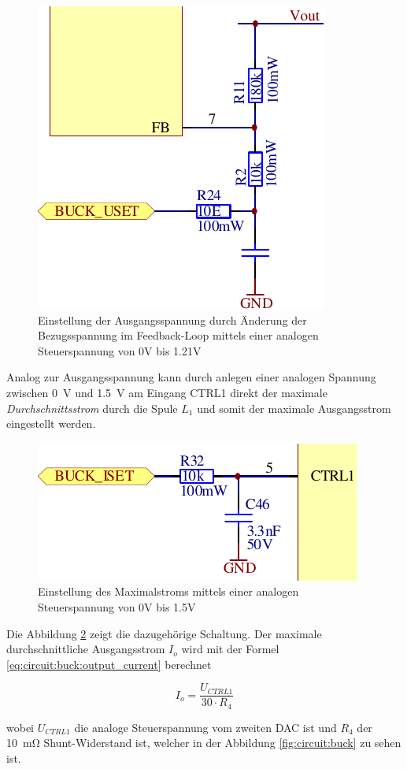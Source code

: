 \begin{figure}[th!]
    \center
    \includegraphics[width=.35\textwidth]{images/circuit/buck-uset.pdf}
    \caption{Einstellung der Ausgangsspannung durch \"Anderung der Bezugsspannung im Feedback-Loop mittels einer analogen Steuerspannung von 0V bis 1.21V}
    \label{fig:circuit:buck:uset}
\end{figure}

Analog zur Ausgangsspannung kann durch anlegen einer analogen Spannung  zwischen
\SI{0}{\volt}  und  \SI{1.5}{\volt}  am  Eingang   CTRL1   direkt  der  maximale
\emph{Durchschnittsstrom}   durch   die  Spule  $L_1$  und  somit  der  maximale
Ausgangsstrom eingestellt werden.

\begin{figure}[th!]
    \center
    \includegraphics[width=.4\textwidth]{images/circuit/buck-iset.pdf}
    \caption{Einstellung des Maximalstroms mittels einer analogen Steuerspannung von 0V bis 1.5V}
    \label{fig:circuit:buck:iset}
\end{figure}

Die Abbildung \ref{fig:circuit:buck:iset} zeigt  die  dazugeh\"orige  Schaltung.
Der   maximale  durchschnittliche  Ausgangsstrom  $I_o$  wird  mit  der   Formel
\ref{eq:circuit:buck:output_current} berechnet

\begin{equation}
    I_o = \frac{U_{CTRL1}}{30 \cdot R_4}
    \label{eq:circuit:buck:output_current}
\end{equation}

wobei $U_{CTRL1}$ die  analoge  Steuerspannung vom zweiten DAC ist und $R_4$ der
\SI{10}{\milli\ohm}    Shunt-Widerstand    ist,   welcher   in   der   Abbildung
\ref{fig:circuit:buck} zu sehen ist.

